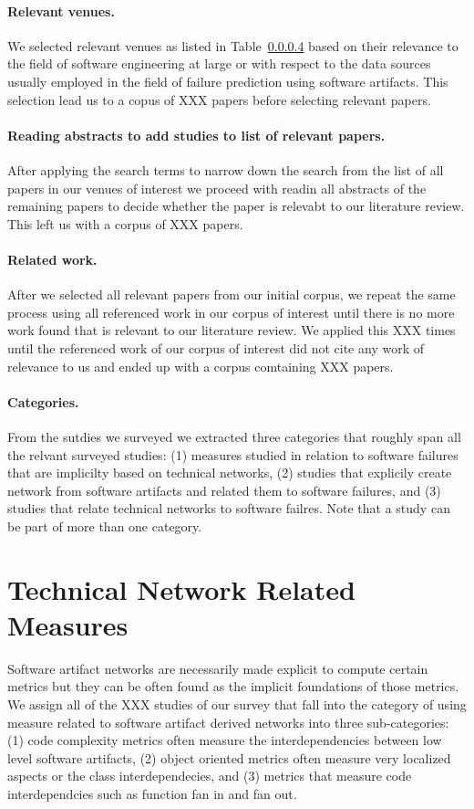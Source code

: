 \paragraph{Relevant venues.} We selected relevant venues as listed in Table~\ref{} based on their relevance to the field of software engineering at large or with respect to the data sources usually employed in the field of failure prediction using software artifacts.
This selection lead us to a copus of XXX papers before selecting relevant papers.

\paragraph{Reading abstracts to add studies to list of relevant papers.} After applying the search terms to narrow down the search from the list of all papers in our venues of interest we proceed with readin all abstracts of the remaining papers to decide whether the paper is relevabt to our literature review.
This left us with a corpus of XXX papers.

\paragraph{Related work.} After we selected all relevant papers from our initial corpus, we repeat the same process using all referenced work in our corpus of interest until there is no more work found that is relevant to our literature review.
We applied this XXX times until the referenced work of our corpus of interest did not cite any work of relevance to us and ended up with a corpus comtaining XXX papers.

\paragraph{Categories.} From the sutdies we surveyed we extracted three categories that roughly span all the relvant surveyed studies:
(1) measures studied in relation to software failures that are implicilty based on technical networks,
(2) studies that explicily create network from software artifacts and related them to software failures,
and (3) studies that relate technical networks to software failres.
Note that a study can be part of more than one category.

\section{Technical Network Related Measures}
\label{chap:6:measure}
Software artifact networks are necessarily made explicit to compute certain metrics but they can be often found as the implicit foundations of those metrics.
We assign all of the XXX studies of our survey that fall into the category of using measure related to software artifact derived networks into three sub-categories:
(1) code complexity metrics often measure the interdependencies between low level software artifacts,
(2) object oriented metrics often measure very localized aspects or the class interdependecies,
and (3) metrics that measure code interdependcies such as function fan in and fan out.


